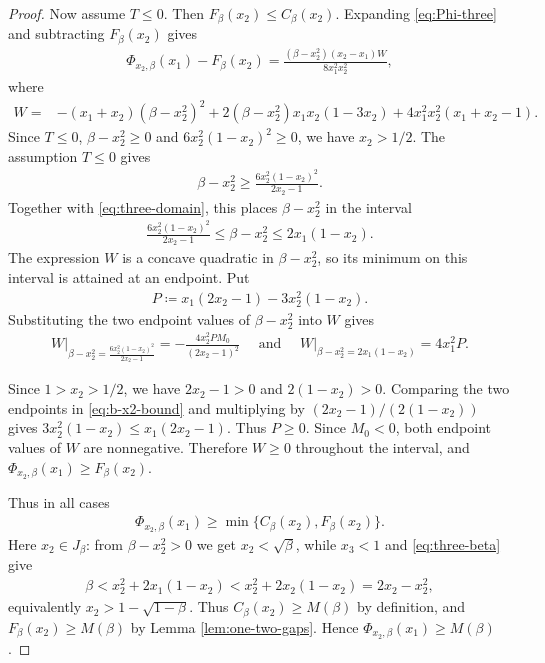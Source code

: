 \documentclass[10pt,a4paper]{article}
\begin{document}
\begin{proof}
Now assume $T\le0$.  Then $F_\beta(x_2)\le C_\beta(x_2)$.  Expanding \eqref{eq:Phi-three} and subtracting $F_\beta(x_2)$ gives
\begin{align}\label{eq:three-F-diff}
  \Phi_{x_2,\beta}(x_1)-F_\beta(x_2)
  =\frac{(\beta-x_2^2)(x_2-x_1)W}{8x_1^2x_2^2},
\end{align}
where
\begin{align*}
W={}&-(x_1+x_2)(\beta-x_2^2)^2+2(\beta-x_2^2)x_1x_2(1-3x_2)+4x_1^2x_2^2(x_1+x_2-1).
\end{align*}
Since $T\le 0$, $\beta-x_2^2\ge0$ and $6x_2^2(1-x_2)^2\ge0$, we have $x_2>1/2$.  The assumption $T\le0$ gives
\begin{align*}
  \beta-x_2^2\ge \frac{6x_2^2(1-x_2)^2}{2x_2-1}.
\end{align*}
Together with \eqref{eq:three-domain}, this places $\beta-x_2^2$ in the interval
\begin{align}\label{eq:b-x2-bound}
  \frac{6x_2^2(1-x_2)^2}{2x_2-1}\le \beta-x_2^2\le 2x_1(1-x_2).
\end{align}
The expression $W$ is a concave quadratic in $\beta-x_2^2$, so its minimum on this interval is attained at an endpoint.  Put
\begin{align*}
  P\coloneqq x_1(2x_2-1)-3x_2^2(1-x_2).
\end{align*}
Substituting the two endpoint values of $\beta-x_2^2$ into $W$ gives
\begin{align*}
  \left.W\right|_{\beta-x_2^2=\frac{6x_2^2(1-x_2)^2}{2x_2-1}}
  =-\frac{4x_2^2PM_0}{(2x_2-1)^2}
\quad\text{ and }\quad
  \left.W\right|_{\beta-x_2^2=2x_1(1-x_2)}=4x_1^2P.
\end{align*}

Since $1>x_2>1/2$, we have $2x_2-1>0$ and $2(1-x_2)>0$.  Comparing the two
endpoints in \eqref{eq:b-x2-bound} and multiplying by
$(2x_2-1)/(2(1-x_2))$ gives
$
  3x_2^2(1-x_2)\le x_1(2x_2-1).
$
Thus $P\ge0$.
Since $M_0<0$, both endpoint values of $W$ are nonnegative.  Therefore $W\ge0$ throughout the interval, and $\Phi_{x_2,\beta}(x_1)\ge F_\beta(x_2)$.

Thus in all cases
\begin{align*}
  \Phi_{x_2,\beta}(x_1)\ge\min\{C_\beta(x_2),F_\beta(x_2)\}.
\end{align*}
Here $x_2\in J_\beta$: from $\beta-x_2^2>0$ we get $x_2<\sqrt\beta$, while $x_3<1$ and \eqref{eq:three-beta} give
\begin{align*}
  \beta<x_2^2+2x_1(1-x_2)<x_2^2+2x_2(1-x_2)=2x_2-x_2^2,
\end{align*}
equivalently $x_2>1-\sqrt{1-\beta}$.  Thus $C_\beta(x_2)\ge M(\beta)$ by definition, and $F_\beta(x_2)\ge M(\beta)$ by Lemma \ref{lem:one-two-gaps}.  Hence $\Phi_{x_2,\beta}(x_1)\ge M(\beta)$.
\end{proof}
\end{document}
